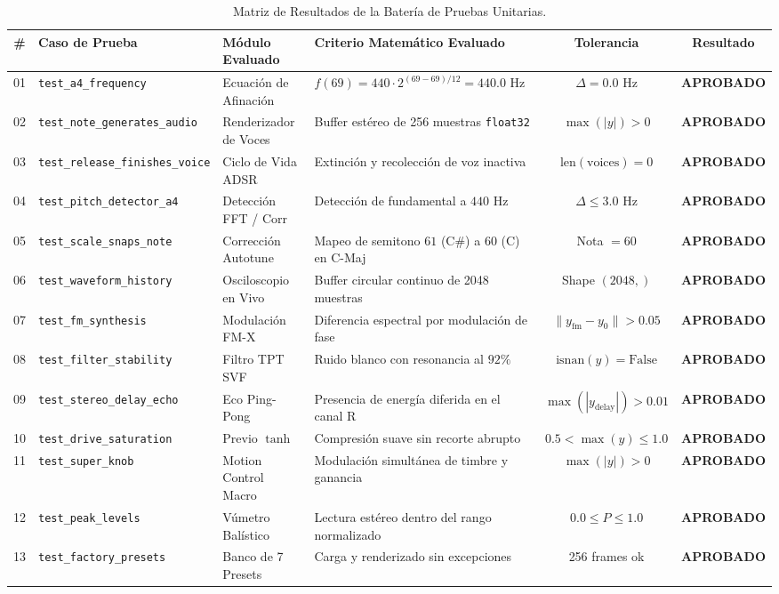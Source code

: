 \documentclass[11pt,a4paper]{article}
\begin{document}
\begin{table}[h!]
\centering
\caption{Matriz de Resultados de la Batería de Pruebas Unitarias.}
\label{tab:unit_tests}
\vspace{0.2cm}
{\scriptsize
\setlength{\tabcolsep}{3pt}
\begin{tabular}{clp{3.0cm}p{4.0cm}cc}
\toprule
\textbf{\#} & \textbf{Caso de Prueba} & \textbf{Módulo Evaluado} & \textbf{Criterio Matemático Evaluado} & \textbf{Tolerancia} & \textbf{Resultado} \\
\midrule
01 & \texttt{test\_a4\_frequency} & Ecuación de Afinación & $f(69) = 440 \cdot 2^{(69-69)/12} = 440.0\text{ Hz}$ & $\Delta = 0.0\text{ Hz}$ & \textbf{APROBADO} \\
02 & \texttt{test\_note\_generates\_audio} & Renderizador de Voces & Buffer estéreo de 256 muestras \texttt{float32} & $\max(|y|) > 0$ & \textbf{APROBADO} \\
03 & \texttt{test\_release\_finishes\_voice} & Ciclo de Vida ADSR & Extinción y recolección de voz inactiva & $\text{len}(\text{voices}) = 0$ & \textbf{APROBADO} \\
04 & \texttt{test\_pitch\_detector\_a4} & Detección FFT / Corr & Detección de fundamental a $440\text{ Hz}$ & $\Delta \le 3.0\text{ Hz}$ & \textbf{APROBADO} \\
05 & \texttt{test\_scale\_snaps\_note} & Corrección Autotune & Mapeo de semitono $61$ (C\#) a $60$ (C) en C-Maj & Nota $= 60$ & \textbf{APROBADO} \\
06 & \texttt{test\_waveform\_history} & Osciloscopio en Vivo & Buffer circular continuo de 2048 muestras & Shape $(2048,)$ & \textbf{APROBADO} \\
07 & \texttt{test\_fm\_synthesis} & Modulación FM-X & Diferencia espectral por modulación de fase & $\|y_{\text{fm}} - y_0\| > 0.05$ & \textbf{APROBADO} \\
08 & \texttt{test\_filter\_stability} & Filtro TPT SVF & Ruido blanco con resonancia al $92\%$ & $\text{isnan}(y) = \text{False}$ & \textbf{APROBADO} \\
09 & \texttt{test\_stereo\_delay\_echo} & Eco Ping-Pong & Presencia de energía diferida en el canal R & $\max(|y_{\text{delay}}|) > 0.01$ & \textbf{APROBADO} \\
10 & \texttt{test\_drive\_saturation} & Previo $\tanh$ & Compresión suave sin recorte abrupto & $0.5 < \max(y) \le 1.0$ & \textbf{APROBADO} \\
11 & \texttt{test\_super\_knob} & Motion Control Macro & Modulación simultánea de timbre y ganancia & $\max(|y|) > 0$ & \textbf{APROBADO} \\
12 & \texttt{test\_peak\_levels} & Vúmetro Balístico & Lectura estéreo dentro del rango normalizado & $0.0 \le P \le 1.0$ & \textbf{APROBADO} \\
13 & \texttt{test\_factory\_presets} & Banco de 7 Presets & Carga y renderizado sin excepciones & 256 frames ok & \textbf{APROBADO} \\
\bottomrule
\end{tabular}
}
\end{table}
\end{document}
